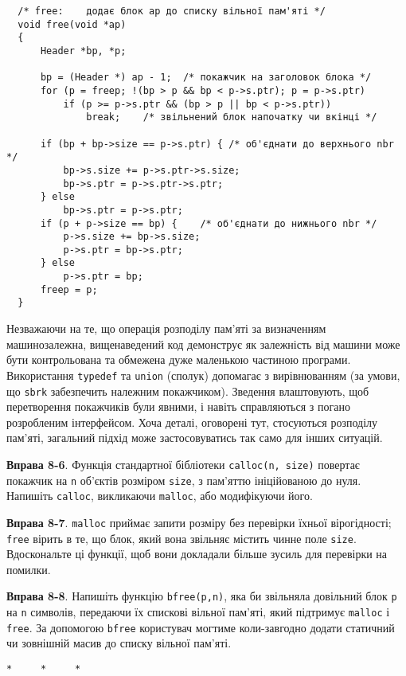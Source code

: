 \documentclass[a4paper,12pt]{book}
\begin{document}
  \begin{verbatim}
  /* free:    додає блок ap до списку вільної пам'яті */
  void free(void *ap)
  {
      Header *bp, *p;

      bp = (Header *) ap - 1;  /* покажчик на заголовок блока */
      for (p = freep; !(bp > p && bp < p->s.ptr); p = p->s.ptr)
          if (p >= p->s.ptr && (bp > p || bp < p->s.ptr))
              break;    /* звільнений блок напочатку чи вкінці */

      if (bp + bp->size == p->s.ptr) { /* об'єднати до верхнього nbr */
          bp->s.size += p->s.ptr->s.size;
          bp->s.ptr = p->s.ptr->s.ptr;
      } else
          bp->s.ptr = p->s.ptr;
      if (p + p->size == bp) {    /* об'єднати до нижнього nbr */
          p->s.size += bp->s.size;
          p->s.ptr = bp->s.ptr;
      } else
          p->s.ptr = bp;
      freep = p;
  }
  \end{verbatim}

  Незважаючи на те, що операція розподілу пам'яті за визначенням машинозалежна,
  вищенаведений код демонструє як залежність від машини може бути контрольована та обмежена
  дуже маленькою частиною програми. Використання \texttt{typedef} та \texttt{union}
  (сполук) допомагає з вирівнюванням (за умови, що \texttt{sbrk} забезпечить належним
  покажчиком). Зведення влаштовують, щоб перетворення покажчиків були явними, і навіть
  справляються з погано розробленим інтерфейсом. Хоча деталі, оговорені тут, стосуються
  розподілу пам'яті, загальний підхід може застосовуватись так само для інших ситуацій.

  \textbf{Вправа 8-6}. Функція стандартної бібліотеки \texttt{calloc(n, size)} повертає
  покажчик на \texttt{n} об'єктів розміром \texttt{size}, з пам'яттю ініційованою до нуля. Напишіть
  \texttt{calloc}, викликаючи \texttt{malloc}, або модифікуючи його.

  \textbf{Вправа 8-7}. \texttt{malloc} приймає запити розміру без перевірки їхньої
  вірогідності; \texttt{free} вірить в те, що блок, який вона звільняє містить чинне поле
  \texttt{size}. Вдоскональте ці функції, щоб вони докладали більше зусиль для перевірки на
  помилки.

  \textbf{Вправа 8-8}. Напишіть функцію \texttt{bfree(p,n)}, яка би звільняла довільний блок
  \texttt{p} на \texttt{n} символів, передаючи їх спискові вільної пам'яті, який підтримує
  \texttt{malloc} і \texttt{free}. За допомогою \texttt{bfree} користувач могтиме
  коли-завгодно додати статичний чи зовнішній масив до списку вільної пам'яті.
  \begin{center}     
  \begin{verbatim}
*     *     *
  \end{verbatim}
  \end{center}
\end{document}
